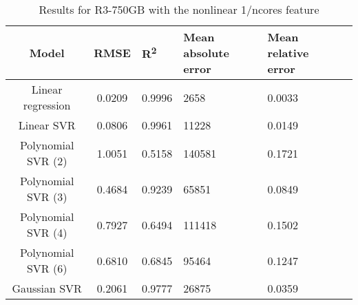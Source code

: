 \begin{table}[H]
\centering
\begin{adjustbox}{center}
\begin{tabular}{c | c M{1.2cm} M{2.5cm} M{2.5cm} M{1.8cm}}
Model & RMSE & R\textsuperscript{2} & Mean absolute error & Mean relative error \tabularnewline
\hline
Linear regression & 0.0209 & 0.9996 &   2658 & 0.0033 \\
Linear SVR & 0.0806 & 0.9961 &  11228 & 0.0149 \\
Polynomial SVR (2) & 1.0051 & 0.5158 & 140581 & 0.1721 \\
Polynomial SVR (3) & 0.4684 & 0.9239 &  65851 & 0.0849 \\
Polynomial SVR (4) & 0.7927 & 0.6494 & 111418 & 0.1502 \\
Polynomial SVR (6) & 0.6810 & 0.6845 &  95464 & 0.1247 \\
Gaussian SVR & 0.2061 & 0.9777 &  26875 & 0.0359 \\
\end{tabular}
\end{adjustbox}
\\
\caption{Results for R3-750GB with the nonlinear 1/ncores feature}
\label{tab:all_nonlinear_R3_750}
\end{table}
